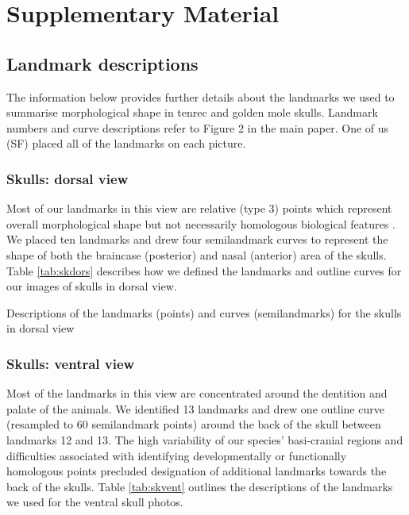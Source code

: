 \documentclass[12pt,a4paper]{article}
\newcommand{\beginsupplement}{%
	       \setcounter{table}{0}
	        \renewcommand{\thetable}{S\arabic{table}}%
	        \setcounter{figure}{0}
	        \renewcommand{\thefigure}{S\arabic{figure}}%
	     }
\begin{document}
\beginsupplement

{\centering\section{Supplementary Material}}

\subsection{Landmark descriptions}
\vspace*{-0.5cm}
	The information below provides further details about the landmarks we used to summarise morphological shape in tenrec and golden mole skulls. Landmark numbers and curve descriptions refer to Figure 2 in the main paper. One of us (SF) placed all of the landmarks on each picture.

\subsubsection{Skulls: dorsal view}
\vspace*{-0.5cm}
	Most of our landmarks in this view are relative (type 3) points which represent overall morphological shape but not necessarily homologous biological features \citep{Zelditch2012}. We placed ten landmarks and drew four semilandmark curves to represent the shape of both the braincase (posterior) and nasal (anterior) area of the skulls. Table \ref{tab:skdors} describes how we defined the landmarks and outline curves for our images of skulls in dorsal view.

\begin{table}[h]
	\caption[Skulls: dorsal landmarks]
		{Descriptions of the landmarks (points) and curves (semilandmarks) for the skulls in dorsal view} 
	
	\label{tab:skdors}
\end{table}

\subsubsection{Skulls: ventral view}
\vspace*{-0.5cm}
	Most of the landmarks in this view are concentrated around the dentition and palate of the animals. We identified 13 landmarks and drew one outline curve (resampled to 60 semilandmark points) around the back of the skull between landmarks 12 and 13. The high variability of our species' basi-cranial regions and difficulties associated with identifying developmentally or functionally homologous points precluded designation of additional landmarks towards the back of the skulls. Table \ref{tab:skvent} outlines the descriptions of the landmarks we used for the ventral skull photos.
\end{document}
